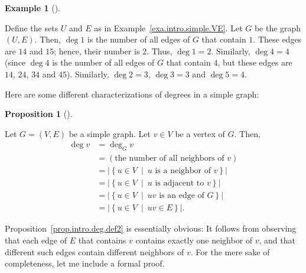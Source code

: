 \documentclass[numbers=enddot,12pt,final,onecolumn,notitlepage]{scrartcl}%
\theoremstyle{definition}
\newtheorem{prop}[theo]{Proposition}
\newenvironment{proposition}[1][]
{\begin{prop}[#1]\begin{leftbar}}
{\end{leftbar}\end{prop}}
\newtheorem{exam}[theo]{Example}
\newenvironment{example}[1][]
{\begin{exam}[#1]\begin{leftbar}}
{\end{leftbar}\end{exam}}
\newcommand{\set}[1]{\left\{ #1 \right\}}
\newcommand{\abs}[1]{\left| #1 \right|}
\newcommand{\tup}[1]{\left( #1 \right)}
\begin{document}
\begin{example} \label{exa.intro.deg}
Define the sets $U$ and $E$ as in Example~\ref{exa.intro.simple.VE}.
Let $G$ be the graph $\tup{U, E}$. Then, $\deg 1$ is the number of all
edges of $G$ that contain $1$. These edges are $14$ and $15$; hence,
their number is $2$. Thus, $\deg 1 = 2$. Similarly, $\deg 4 = 4$
(since $\deg 4$ is the number of all edges of $G$ that contain $4$,
but these edges are $14$, $24$, $34$ and $45$). Similarly,
$\deg 2 = 3$, $\deg 3 = 3$ and $\deg 5 = 4$.
\end{example}

Here are some different characterizations of degrees in a simple
graph:

\begin{proposition} \label{prop.intro.deg.def2}
Let $G = \tup{V, E}$ be a simple graph. Let $v \in V$ be a vertex of
$G$. Then,
\begin{align}
\deg v &= \deg_G v
\label{eq.def.intro.deg.G} \\
&= \left(\text{the number of all neighbors of } v\right)
\label{eq.def.intro.deg.1} \\
&= \abs{\set{u \in V \ \mid \ u \text{ is a neighbor of } v }}
\label{eq.def.intro.deg.2} \\
&= \abs{\set{u \in V \ \mid \ u \text{ is adjacent to } v }}
\label{eq.def.intro.deg.3} \\
&= \abs{\set{u \in V \ \mid \ uv \text{ is an edge of } G }}
\label{eq.def.intro.deg.4} \\
&= \abs{\set{u \in V \ \mid \ uv \in E }} .
\label{eq.def.intro.deg.5}
\end{align}
\end{proposition}

Proposition~\ref{prop.intro.deg.def2} is essentially obvious: It
follows from observing that each edge of $E$ that contains $v$
contains exactly one neighbor of $v$, and that different such edges
contain different neighbors of $v$. For the mere sake of completeness,
let me include a formal proof.
\end{document}
